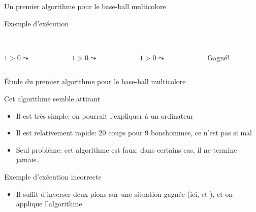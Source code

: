 \documentclass[final,hyperref={pdfpagelabels=false}]{beamer}
\renewenvironment{Coupe}{   }{   }
\renewcommand*{\small}{\fontsize{\resultsmallX}{\resultsmallY}\selectfont}
\begin{document}
\begin{Coupe}
\begin{frame}{Un premier algorithme pour le base-ball multicolore}
\begin{block}{Exemple d'exécution}
\begin{columns}[t]
      \begin{column}{.15\linewidth}\center
        \\
         {\small $1>0\leadsto$ }
      \end{column}

      \begin{column}{.15\linewidth}\center
        \\
         {\small $1>0\leadsto$ }
      \end{column}

      \begin{column}{.15\linewidth}\center
        \\
         {\small $1>0\leadsto$ }
      \end{column}

      \begin{column}{.15\linewidth}\center
        \\
         \alert{Gagné!}
      \end{column}
    \end{columns}
  \end{block}
\end{frame}
\newcommand{\maisonOk}[1]{\foreach \x in {#1} {\draw[shift=(m.corner \x)] node
    {\small x};}}
\begin{frame}{Étude du premier algorithme pour le base-ball multicolore}
  \begin{block}{Cet algorithme semble attirant}
    \begin{itemize}
    \item Il est très simple: on pourrait l'expliquer à un ordinateur
    \item Il est relativement rapide: 20 coups pour 9 bonshommes, ce n'est pas
      si mal
    \item Seul problème: cet algorithme est faux: dans certains cas, il ne
      termine jamais\ldots
    \end{itemize}
  \end{block}

  \begin{block}{Exemple d'exécution incorrecte}
    \begin{itemize}
    \item Il suffit d'inverser deux pions sur une situation gagnée (ici,
       et ), et on applique l'algorithme 
    \end{itemize}\vspace{-\baselineskip}


\end{block}
\end{frame}
\end{Coupe}
\end{document}
